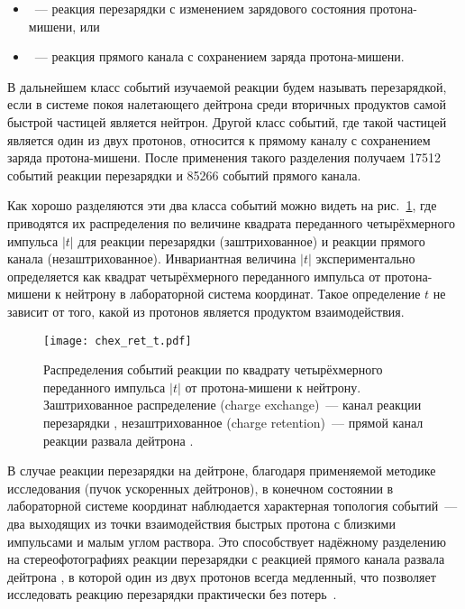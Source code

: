 \begin{itemize}
\item \dpchex~--- реакция перезарядки с изменением зарядового состояния
  протона-мишени, или
\item \dpret~--- реакция прямого канала с сохранением заряда протона-мишени.
\end{itemize}
В дальнейшем класс событий изучаемой реакции будем называть перезарядкой, если в
системе покоя налетающего дейтрона среди вторичных продуктов самой быстрой
частицей является нейтрон. Другой класс событий, где такой частицей является
один из двух протонов, относится к прямому каналу с сохранением заряда
протона-мишени. После применения такого разделения получаем 17512 событий
реакции перезарядки и 85266 событий прямого канала.

Как хорошо разделяются эти два класса событий можно видеть на
рис.~\ref{fig:chex_ret_t}, где приводятся их распределения по величине квадрата
переданного четырёхмерного импульса $|t|$ для реакции перезарядки
(заштрихованное) и реакции прямого канала (незаштрихованное). Инвариантная
величина $|t|$ экспериментально определяется как квадрат четырёхмерного
переданного импульса от протона-мишени к нейтрону в лабораторной система
координат. Такое определение $t$ не зависит от того, какой из протонов является
продуктом взаимодействия.

\begin{figure}[h]
  \centering
  \texttt{[image: chex\_ret\_t.pdf]}
  \caption{Распределения событий реакции \dpfrag по квадрату четырёхмерного
    переданного импульса $|t|$ от протона-мишени к нейтрону. Заштрихованное
    распределение (charge exchange)~--- канал реакции перезарядки \dpchex,
    незаштрихованное (charge retention)~--- прямой канал реакции развала
    дейтрона \dpret.}
  \label{fig:chex_ret_t}
\end{figure}

В случае реакции перезарядки на дейтроне, благодаря применяемой методике
исследования (пучок ускоренных дейтронов), в конечном состоянии в лабораторной
системе координат наблюдается характерная топология событий~--- два выходящих
из точки взаимодействия быстрых протона с близкими импульсами и малым углом
раствора. Это способствует надёжному разделению на стереофотографиях реакции
перезарядки \dpchex с реакцией прямого канала развала дейтрона \dpret, в которой
один из двух протонов всегда медленный, что позволяет исследовать реакцию
перезарядки практически без потерь~\cite{balga88}.

